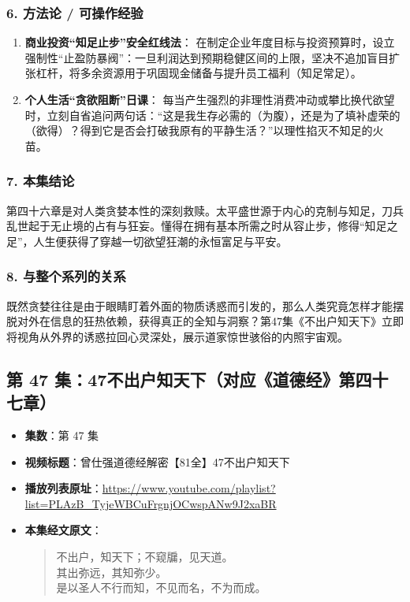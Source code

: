 \subsubsection{6. 方法论 / 可操作经验}
\begin{enumerate}
    \item \textbf{商业投资“知足止步”安全红线法}：
    在制定企业年度目标与投资预算时，设立强制性“止盈防暴阀”：一旦利润达到预期稳健区间的上限，坚决不追加盲目扩张杠杆，将多余资源用于巩固现金储备与提升员工福利（知足常足）。
    \item \textbf{个人生活“贪欲阻断”日课}：
    每当产生强烈的非理性消费冲动或攀比换代欲望时，立刻自省追问两句话：“这是我生存必需的（为腹），还是为了填补虚荣的（欲得）？得到它是否会打破我原有的平静生活？”以理性掐灭不知足的火苗。
\end{enumerate}

\subsubsection{7. 本集结论}
第四十六章是对人类贪婪本性的深刻救赎。太平盛世源于内心的克制与知足，刀兵乱世起于无止境的占有与狂妄。懂得在拥有基本所需之时从容止步，修得“知足之足”，人生便获得了穿越一切欲望狂潮的永恒富足与平安。

\subsubsection{8. 与整个系列的关系}
既然贪婪往往是由于眼睛盯着外面的物质诱惑而引发的，那么人类究竟怎样才能摆脱对外在信息的狂热依赖，获得真正的全知与洞察？第47集《不出户知天下》立即将视角从外界的诱惑拉回心灵深处，展示道家惊世骇俗的内照宇宙观。

\clearpage

\subsection{第 47 集：47不出户知天下（对应《道德经》第四十七章）}
\label{sec:ep47}

\begin{itemize}
    \item \textbf{集数}：第 47 集
    \item \textbf{视频标题}：曾仕强道德经解密【81全】47不出户知天下
    \item \textbf{播放列表原址}：\url{https://www.youtube.com/playlist?list=PLAzB_TyjeWBCuFrgnjOCwspANw9J2xaBR}
    \item \textbf{本集经文原文}：
    \begin{quote}\kaishu
    不出户，知天下；不窥牖，见天道。\\
    其出弥远，其知弥少。\\
    是以圣人不行而知，不见而名，不为而成。
    \end{quote}
\end{itemize}


